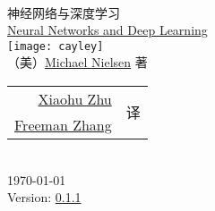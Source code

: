 
\begin{titlepage}
\begin{center}
  \hfill\\
  \vspace{1cm}
  {\fontsize{36pt}{40pt}\NotoSansSCBold{} 神经网络与深度学习}\\
  \vspace{1em}
  {\LARGE\RobotoRegular{} \href{http://neuralnetworksanddeeplearning.com/index.html}{Neural Networks and Deep Learning}}\\
  \vspace{1cm}
  \texttt{[image: cayley]}\\
  \vspace{1cm}
  {\LARGE （美）\href{http://michaelnielsen.org/}{Michael Nielsen} 著}\\
  \vspace{1cm}
  {\Large
    \begin{tabular}{rl}
      \href{mailto:xhzhu.nju@gmail}{Xiaohu Zhu} & \multirow{2}{*}{译} \\
      \href{mailto:zhanggyb@gmail.com}{Freeman Zhang} & \\
    \end{tabular}
  }\\
  \vfill
  {\large \today}\\
  \vspace{1em}
  {\large Version: \href{https://github.com/zhanggyb/nndl/releases/tag/0.1.1}{0.1.1}}
\end{center}
\end{titlepage}

